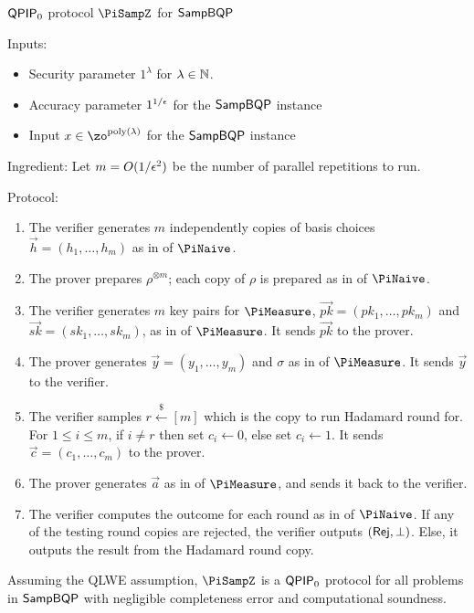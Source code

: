 \begin{protocol}{$\operatorname{\mathsf{QPIP}}_0$ protocol $\PiSampZ$ for $\operatorname{\mathsf{SampBQP}}$}
	\label{proto:QPIP0samp}

	Inputs:
	\begin{itemize}
		\item Security parameter $1^\lambda$ for $\lambda\in\mathbb{N}$.
		\item Accuracy parameter $1^{1/\epsilon}$ for the $\operatorname{\mathsf{SampBQP}}$ instance
		\item Input $x\in\zo^{\poly(\lambda)}$ for the $\operatorname{\mathsf{SampBQP}}$ instance
	\end{itemize}

	Ingredient: Let $m=O(1/\epsilon^2)$ be the number of parallel repetitions to run.

	Protocol:
	\begin{enumerate}
		\item The verifier generates $m$ independently copies of basis choices $\vec{h}=(h_1,\ldots,h_m)$ as in  of $\PiNaive$.
		\item The prover prepares $\rho^{\otimes m}$; each copy of $\rho$ is prepared as in  of $\PiNaive$.
		\item The verifier generates $m$ key pairs for $\PiMeasure$, $\vec{pk}=(pk_1,\ldots,pk_m)$ and $\vec{sk}=(sk_1,\ldots,sk_m)$, as in  of $\PiMeasure$.
			It sends $\vec{pk}$ to the prover.
		\item The prover generates $\vec{y}=(y_1,\ldots,y_m)$ and $\sigma$ as in  of $\PiMeasure$.
			It sends $\vec{y}$ to the verifier.
		\item The verifier samples $r\xleftarrow{\$}[m]$ which is the copy to run Hadamard round for.
			For $1\leq i\leq m$, if $i\ne r$ then set $c_i\leftarrow 0$, else set $c_i\leftarrow 1$.
			It sends $\vec{c}=(c_1,\ldots,c_m)$ to the prover.
		\item The prover generates $\vec{a}$ as in  of $\PiMeasure$, and sends it back to the verifier.
		\item \label{step:multi-testing}
			The verifier computes the outcome for each round as in  of $\PiNaive$.
			If any of the testing round copies are rejected, the verifier outputs $(\mathsf{Rej}, \bot)$.
			Else, it outputs the result from the Hadamard round copy.
	\end{enumerate}
\end{protocol}

\begin{theorem}\label{thm:qpip0}
	Assuming the QLWE assumption, $\PiSampZ$ is a $\operatorname{\mathsf{QPIP}}_0$ protocol for all problems in $\operatorname{\mathsf{SampBQP}}$ with negligible  completeness error and computational soundness.
\end{theorem}


